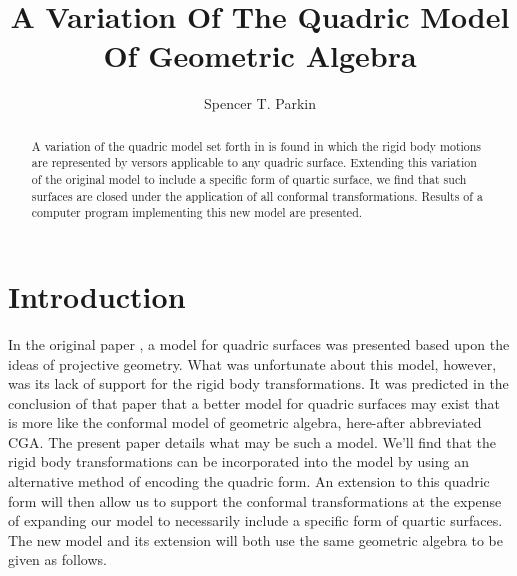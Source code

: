 \documentclass{birkjour}
\theoremstyle{definition}
\theoremstyle{remark}
\numberwithin{equation}{section}
\begin{document}
\title{A Variation Of The Quadric Model\\Of Geometric Algebra}

\author{Spencer T. Parkin}
\address{Avalanche Software\\
102 West 500 South\\
Salt Lake City, Utah 84101}





\begin{abstract}
A variation of the quadric model set forth in \cite{Parkin12} is
found in which the rigid body motions are represented by
versors applicable to any quadric surface.
Extending this variation of the original model to include
a specific form of quartic surface, we find that such surfaces are
closed under the application of all conformal transformations.
Results of a computer program implementing this new model are presented.
\end{abstract}

\maketitle

\section{Introduction}

In the original paper \cite{Parkin12}, a model for quadric surfaces was
presented based upon the ideas of projective geometry.  What was unfortunate
about this model, however, was its lack of support for the rigid body transformations.  It was
predicted in the conclusion of that paper that a better model for quadric
surfaces may exist that is more like the conformal model of geometric algebra, here-after
abbreviated CGA.
The present paper details what may be such a model.  We'll find that the rigid
body transformations can be incorporated into the model by using an alternative
method of encoding the quadric form.  An extension to this quadric form
will then allow us to support the conformal transformations at the expense of
expanding our model to necessarily include a specific form of quartic surfaces.  The
new model and its extension will both use the same geometric algebra to be given as follows.
\end{document}
